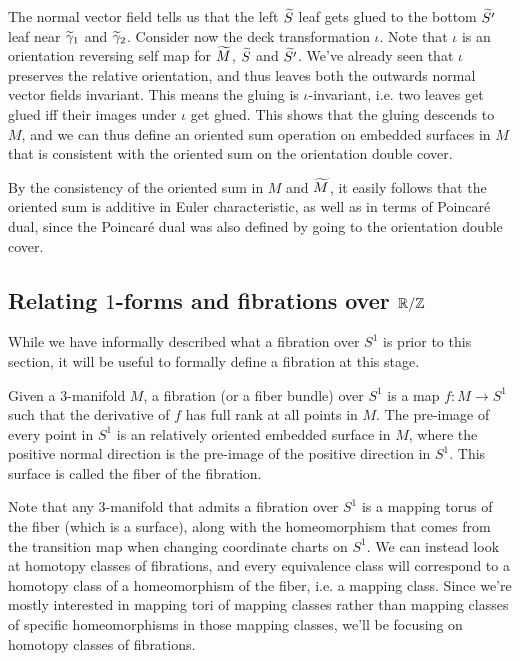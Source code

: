 The normal vector field tells us that the left $\widetilde{S}$ leaf gets glued to the bottom $\widetilde{S'}$
leaf near $\widetilde{\gamma}_1$ and $\widetilde{\gamma}_2$. Consider now the deck transformation $\iota$. Note
that $\iota$ is an orientation reversing self map for $\widetilde{M}$, $\widetilde{S}$ and $\widetilde{S'}$. We've
already seen that $\iota$ preserves the relative orientation, and thus leaves both the outwards
normal vector fields invariant. This means the gluing is $\iota$-invariant, i.e.  two leaves get
glued iff their images under $\iota$ get glued. This shows that the gluing descends to $M$, and we
can thus define an oriented sum operation on embedded surfaces in $M$ that is consistent with the
oriented sum on the orientation double cover.

By the consistency of the oriented sum in $M$ and $\widetilde{M}$, it easily follows that the oriented sum
is additive in Euler characteristic, as well as in terms of Poincar\'e dual, since the Poincar\'e
dual was also defined by going to the orientation double cover.

\subsection{Relating $1$-forms and fibrations over $\mathbb{R}/\mathbb{Z}$}
\label{sec:relating-1-forms}
While we have informally described what a fibration over $S^1$ is prior to this section, it will be
useful to formally define a fibration at this stage.
\begin{defn}
  Given a $3$-manifold $M$, a fibration (or a fiber bundle) over $S^1$ is a map $f: M \to S^1$ such
  that the derivative of $f$ has full rank at all points in $M$. The pre-image of every point in
  $S^1$ is an relatively oriented embedded surface in $M$, where the positive normal direction is
  the pre-image of the positive direction in $S^1$. This surface is called the fiber of the
  fibration.
\end{defn}
Note that any $3$-manifold that admits a fibration over $S^1$ is a mapping torus of the fiber
(which is a surface), along with the homeomorphism that comes from the transition map when changing
coordinate charts on $S^1$. We can instead look at homotopy classes of fibrations, and every
equivalence class will correspond to a homotopy class of a homeomorphism of the fiber, i.e. a
mapping class. Since we're mostly interested in mapping tori of mapping classes rather than mapping
classes of specific homeomorphisms in those mapping classes, we'll be focusing on homotopy classes
of fibrations.

